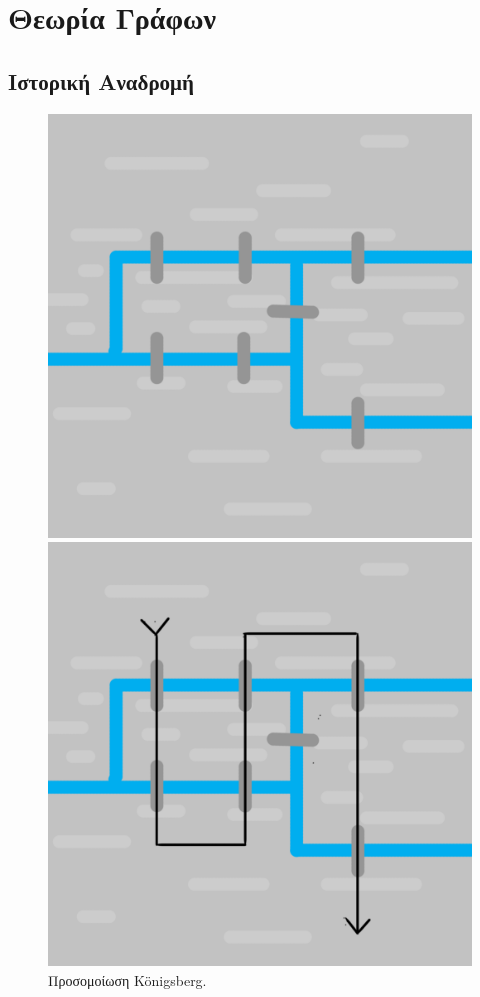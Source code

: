 \section{Θεωρία Γράφων}
\subsection{Ιστορική Αναδρομή}
\begin{figure}[ht]
    \begin{minipage}[c]{.46\linewidth}
        \centering
        \includegraphics[scale=0.15]{2947_thesis/pictures/konigsberg.png}
        \caption{Προσομοίωση Königsberg.}
        \label{1}
    \end{minipage}
    \hfill%
    \begin{minipage}[c]{.46\linewidth}
        \centering
        \includegraphics[scale=0.15]{2947_thesis/pictures/konigsbergEx.png} 

\end{minipage}
\end{figure}
